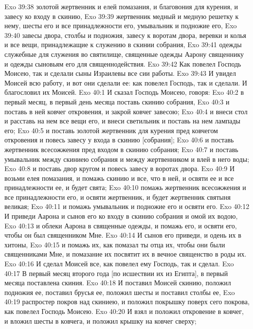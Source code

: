 \vs Exo 39:38 золотой жертвенник и елей помазания, и благовония для курения, и завесу ко входу в скинию,
\vs Exo 39:39 жертвенник медный и медную решетку к нему, шесты его и все принадлежности его, умывальник и подножие его,
\vs Exo 39:40 завесы двора, столбы и подножия, завесу к воротам двора, веревки и колья и все вещи, принадлежащие к служению в скинии собрания,
\vs Exo 39:41 одежды служебные для служения во святилище, священные одежды Аарону священнику и одежды сыновьям его для священнодействия.
\vs Exo 39:42 Как повелел Господь Моисею, так и сделали сыны Израилевы все сии работы.
\vs Exo 39:43 И увидел Моисей всю работу, и вот они сделали ее: как повелел Господь, так и сделали. И благословил их Моисей.
\vs Exo 40:1 И сказал Господь Моисею, говоря:
\vs Exo 40:2 в первый месяц, в первый день месяца поставь скинию собрания,
\vs Exo 40:3 и поставь в ней ковчег откровения, и закрой ковчег завесою;
\vs Exo 40:4 и внеси стол и расставь на нем все вещи его, и внеси светильник и поставь на нем лампады его;
\vs Exo 40:5 и поставь золотой жертвенник для курения пред ковчегом откровения и повесь завесу у входа в скинию [собрания];
\vs Exo 40:6 и поставь жертвенник всесожжения пред входом в скинию собрания;
\vs Exo 40:7 и поставь умывальник между скиниею собрания и между жертвенником и влей в него воды;
\vs Exo 40:8 и поставь двор кругом и повесь завесу в воротах двора.
\vs Exo 40:9 И возьми елея помазания, и помажь скинию и все, что в ней, и освяти ее и все принадлежности ее, и будет свята;
\vs Exo 40:10 помажь жертвенник всесожжения и все принадлежности его, и освяти жертвенник, и будет жертвенник святыня великая;
\vs Exo 40:11 и помажь умывальник и подножие его и освяти его.
\vs Exo 40:12 И приведи Аарона и сынов его ко входу в скинию собрания и омой их водою,
\vs Exo 40:13 и облеки Аарона в священные одежды, и помажь его, и освяти его, чтобы он был священником Мне.
\vs Exo 40:14 И сынов его приведи, и одень их в хитоны,
\vs Exo 40:15 и помажь их, как помазал ты отца их, чтобы они были священниками Мне, и помазание их посвятит их в вечное священство в роды их.
\rsbpar\vs Exo 40:16 И сделал Моисей все, как повелел ему Господь, так и сделал.
\vs Exo 40:17 В первый месяц второго года [по исшествии их из Египта], в первый  месяца поставлена скиния.
\vs Exo 40:18 И поставил Моисей скинию, положил подножия ее, поставил брусья ее, положил шесты и поставил столбы ее,
\vs Exo 40:19 распростер покров над скиниею, и положил покрышку поверх сего покрова, как повелел Господь Моисею.
\vs Exo 40:20 И взял и положил откровение в ковчег, и вложил шесты в  ковчега, и положил крышку на ковчег сверху;
